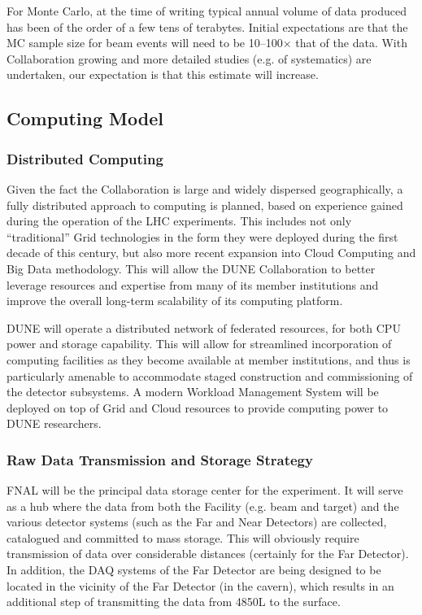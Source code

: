 For Monte Carlo, at the time of writing typical annual volume of data
produced has been of the order of a few tens of terabytes.  Initial
expectations are that the MC sample size for beam events will need to
be 10--100$\times$ that of the data.  With Collaboration growing
and more detailed studies (e.g. of systematics) are undertaken, our
expectation is that this estimate will increase.

\subsection{Computing Model}
\label{sec:detectors-sc-infrastructure-computing-model}

\subsubsection{Distributed Computing}

Given the fact the Collaboration is large and widely dispersed
geographically, a fully distributed approach to computing is planned,
based on experience gained during the operation of the LHC
experiments. This includes not only ``traditional'' Grid technologies
in the form they were deployed during the first decade of this
century, but also more recent expansion into Cloud Computing and Big
Data methodology. This will allow the DUNE Collaboration to better
leverage resources and expertise from many of its member institutions
and improve the overall long-term scalability of its computing
platform.

DUNE will operate a distributed network of federated resources, for
both CPU power and storage capability. This will allow for streamlined
incorporation of computing facilities as they become available at
member institutions, and thus is particularly amenable to accommodate
staged construction and commissioning of the detector subsystems. A
modern Workload Management System will be deployed on top of Grid and
Cloud resources to provide computing power to DUNE researchers.

\subsubsection{Raw Data Transmission and Storage Strategy}
FNAL will be the principal data storage center for the experiment. It
will serve as a hub where the data from both the Facility (e.g. beam
and target) and the various detector systems (such as the Far and Near
Detectors) are collected, catalogued and committed to mass
storage. This will obviously require transmission of data over
considerable distances (certainly for the Far Detector). In addition,
the DAQ systems of the Far Detector are being designed to be located
in the vicinity of the Far Detector (in the cavern), which results in
an additional step of transmitting the data from 4850L to the surface.

